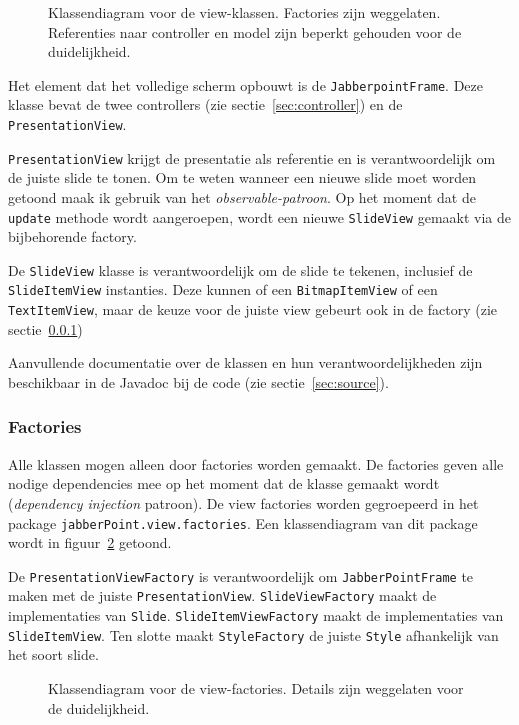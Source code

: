 \documentclass[a4paper]{article}
\newcommand{\code}[1]{\lstinline[columns=fixed]{#1}}
\newcommand{\diagram}[3][1.3]{
	\begin{figure}[!htb]
	 \caption{#3}
	 \label{diagram:#2}
	 \makebox[\textwidth][c]{\texttt{[image: Diagrams/\#2.pdf]}}%
	\end{figure}
}
\begin{document}
		\diagram{view}{
			Klassendiagram voor de view-klassen.
			Factories zijn weggelaten.
			Referenties naar controller en model zijn beperkt gehouden voor de duidelijkheid.
		}

		Het element dat het volledige scherm opbouwt is de \code{JabberpointFrame}.
		Deze klasse bevat de twee controllers (zie sectie~\ref{sec:controller}) en de \code{PresentationView}.

		\code{PresentationView} krijgt de presentatie als referentie en is verantwoordelijk om de juiste slide te tonen.
		Om te weten wanneer een nieuwe slide moet worden getoond maak ik gebruik van het \textit{observable-patroon}.
		Op het moment dat de \code{update} methode wordt aangeroepen, wordt een nieuwe \code{SlideView} gemaakt via de bijbehorende factory.

		De \code{SlideView} klasse is verantwoordelijk om de slide te tekenen, inclusief de \code{SlideItemView} instanties.
		Deze kunnen of een \code{BitmapItemView} of een \code{TextItemView}, maar de keuze voor de juiste view gebeurt ook in de factory (zie sectie~\ref{sec:view-factories})

		Aanvullende documentatie over de klassen en hun verantwoordelijkheden zijn beschikbaar in de Javadoc bij de code (zie sectie~\ref{sec:source}).

		\subsubsection{Factories}\label{sec:view-factories}
			Alle klassen mogen alleen door factories worden gemaakt.
			De factories geven alle nodige dependencies mee op het moment dat de klasse gemaakt wordt (\textit{dependency injection} patroon).
			De view factories worden gegroepeerd in het package \code{jabberPoint.view.factories}.
			Een klassendiagram van dit package wordt in figuur~\ref{diagram:view-factories} getoond.

			De \code{PresentationViewFactory} is verantwoordelijk om \code{JabberPointFrame} te maken met de juiste \code{PresentationView}.
			\code{SlideViewFactory} maakt de implementaties van \code{Slide}.
			\code{SlideItemViewFactory} maakt de implementaties van \code{SlideItemView}.
			Ten slotte maakt \code{StyleFactory} de juiste \code{Style} afhankelijk van het soort slide.

			\diagram[0.9]{view-factories}{
				Klassendiagram voor de view-factories.\label{diagram:view-factories}
				Details zijn weggelaten voor de duide\-lijk\-heid.
			}
\end{document}
